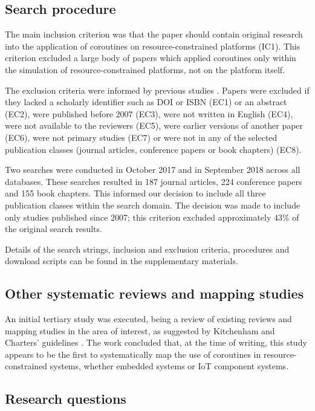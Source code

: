 \documentclass[format=acmsmall, review=false, screen=false]{acmart}
\begin{document}
\subsection{Search procedure}

The main inclusion criterion was that the paper should contain original research into the application of coroutines on resource-constrained platforms (IC1). This criterion excluded a large body of papers which applied coroutines only within the simulation of resource-constrained platforms, not on the platform itself.

The exclusion criteria were informed by previous studies \cite{Kitchenham2007, Petersen2008}. Papers were excluded if they lacked a scholarly identifier such as DOI or ISBN (EC1) or an abstract (EC2), were published before 2007 (EC3), were not written in English (EC4), were not available to the reviewers (EC5), were earlier versions of another paper (EC6), were not primary studies (EC7) or were not in any of the selected publication classes (journal articles, conference papers or book chapters) (EC8).

Two searches were conducted in October 2017 and in September 2018 across all databases. These searches resulted in 187 journal articles, 224 conference papers and 155 book chapters. This informed our decision to include all three publication classes within the search domain. The decision was made to include only studies published since 2007; this criterion excluded approximately 43\% of the original search results.

Details of the search strings, inclusion and exclusion criteria, procedures and download scripts can be found in the supplementary materials.

\subsection{Other systematic reviews and mapping studies}

An initial tertiary study was executed, being a review of existing reviews and mapping studies in the area of interest, as suggested by Kitchenham and Charters’ guidelines \cite{Kitchenham2007}. The work concluded that, at the time of writing, this study appears to be the first to systematically map the use of coroutines in resource-constrained systems, whether embedded systems or IoT component systems.

\subsection{Research questions}
\end{document}

